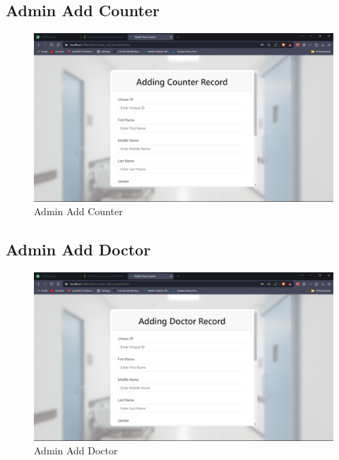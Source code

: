 \subsection{Admin Add Counter}
\begin{figure}[h!]
    \centering
    \includegraphics[width=\textwidth]{Admin_add_Counter.png}
    \caption{Admin Add Counter}
\end{figure}
\subsection{Admin Add Doctor}
\begin{figure}[h!]
    \centering
    \includegraphics[width=\textwidth]{Admin_add_Doctor.png}
    \caption{Admin Add Doctor}
\end{figure}

\clearpage
